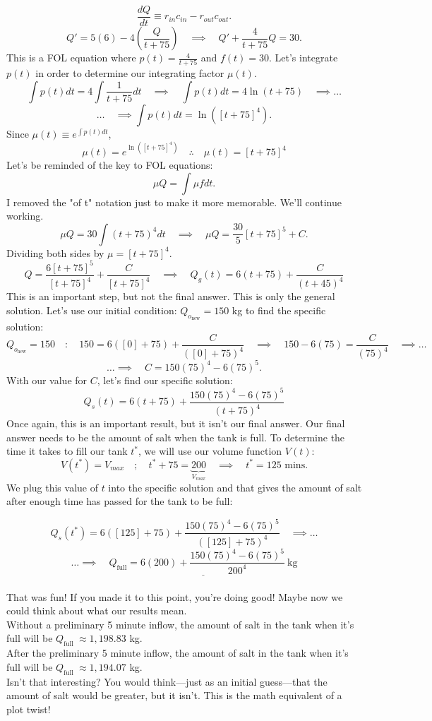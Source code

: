 \documentclass[a4paper,12pt]{article} %
\begin{document}
$$ \frac{dQ}{dt} \equiv r_{in}c_{in} - r_{out}c_{out}. $$
$$ Q' = 5(6) - 4\left(\frac{Q}{t + 75}\right) \quad\implies\quad Q' + \frac{4}{t + 75}Q = 30. $$
This is a FOL equation where $p(t) = \frac{4}{t + 75}$ and $f(t) = 30$. Let's integrate $p(t)$ in order to determine our integrating factor $\mu(t)$.
$$ \int p(t) dt = 4\int\frac{1}{t + 75}dt \quad\implies\quad \int p(t)dt = 4\ln{(t + 75)} \quad\implies\ldots  $$
$$ \ldots\quad\implies \int p(t)dt = \ln{([t + 75]^4)}. $$
Since $\mu(t) \equiv e^{\int p(t) dt}$,
$$ \mu(t) = e^{\ln{([t + 75]^4)}} \quad\therefore\quad \mu(t) = [t+75]^4 $$
Let's be reminded of the key to FOL equations:
$$ \mu Q = \int \mu f dt. $$
I removed the "of t" notation just to make it more memorable. We'll continue working.
$$ \mu Q = 30\int(t + 75)^4dt  \quad\implies\quad \mu Q = \frac{30}{5}\left[t + 75\right]^5 + C. $$
Dividing both sides by $\mu = [t + 75]^4$.
$$ Q = \frac{6[t+75]^5}{[t+75]^4} + \frac{C}{[t + 75]^4} \quad\implies\quad \boxed{Q_g(t) = 6(t+75) + \frac{C}{(t + 45)^4}} $$
This is an important step, but not the final answer. This is only the general solution. Let's use our initial condition: $Q_{o_{\text{new}}}=150$ kg to find the specific solution:
$$ Q_{o_{\text{new}}}=150 \quad:\quad 150 = 6([0] + 75) + \frac{C}{([0] + 75)^4} \quad\implies\quad 150 - 6(75) = \frac{C}{(75)^4} \quad\implies\ldots$$
$$ \ldots\implies\quad C = 150(75)^4 - 6(75)^5. $$
With our value for $C$, let's find our specific solution:
$$ \boxed{Q_{s}(t) = 6(t + 75) + \frac{150(75)^4 - 6(75)^5}{(t + 75)^4}} $$
Once again, this is an important result, but it isn't our final answer. Our final answer needs to be the amount of salt when the tank is full. To determine the time it takes to fill our tank $t^*$, we will use our volume function $V(t)$:
$$
 V\left(t^*\right)=V_{max} \quad ; \quad t^*+75=\underbrace{200}_{V_{max}} \quad \implies \quad t^*=125 \text { mins} . 
 $$
 We plug this value of $t$ into the specific solution and that gives the amount of salt after enough time has passed for the tank to be full:
 
 $$ Q_s(t^*) = 6([125] + 75) + \frac{150(75)^4 - 6(75)^5}{([125] + 75)^4} \quad\implies\ldots $$
 $$ \ldots\implies\quad \underline{\boxed{Q_{\text{full}} = 6(200) + \frac{150(75)^4 - 6(75)^5}{200^4} \mathrm{~kg}}} $$\\

That was fun! If you made it to this point, you're doing good! Maybe now we could think about what our results mean.\\

Without a preliminary 5 minute inflow, the amount of salt in the tank when it's full will be $Q_{\text{full }}$$\approx 1,198.83$ kg.\\

After the preliminary 5 minute inflow, the amount of salt in the tank when it's full will be $Q_{\text{full }}$$\approx 1,194.07$ kg.\\

Isn't that interesting? You would think---just as an initial guess---that the amount of salt would be greater, but it isn't. This is the math equivalent of a plot twist!
\end{document}
